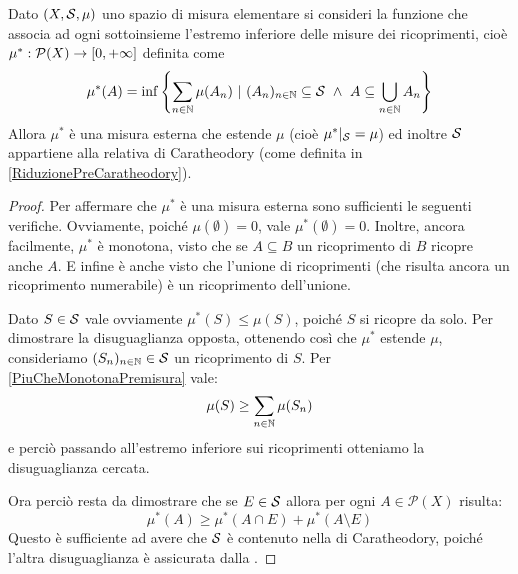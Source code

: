 \begin{proposition}\label{MisuraEsternaDiPremisura}
	Dato $(X,\S,\mu)$ uno spazio di misura elementare si consideri la funzione che associa ad ogni sottoinsieme l'estremo inferiore delle misure dei ricoprimenti, cioè $\mu^*:\mathcal P(X)\to\Rpiu$ definita come 
	\begin{equation*}
		\mu^*(A)=\inf\left\{\sum_{n\in\N} \mu(A_n)\ |\ (A_n)_{n\in\N}\subseteq\S\ \wedge
		\ A\subseteq\bigcup_{n\in\N}A_n\right\}
	\end{equation*}
	Allora $\mu^*$ è una misura esterna che estende $\mu$ (cioè $\mu^*|_\S=\mu$) ed inoltre $\S$ appartiene alla relativa \sigalg{} di Caratheodory (come definita in \cref{RiduzionePreCaratheodory}).
\end{proposition}
\begin{proof}
	Per affermare che $\mu^*$ è una misura esterna sono sufficienti le seguenti verifiche.
	Ovviamente, poiché $\mu(\emptyset)=0$, vale $\mu^*(\emptyset)=0$. 
	Inoltre, ancora facilmente, $\mu^*$ è monotona, visto che se $A\subseteq B$ un ricoprimento di $B$ ricopre anche $A$.
	E infine è anche \sigsubadd{} visto che l'unione di ricoprimenti (che risulta ancora un ricoprimento numerabile) è un ricoprimento dell'unione.
	
	Dato $S\in\S$ vale ovviamente $\mu^*(S)\le\mu(S)$, poiché $S$ si ricopre da solo. Per dimostrare la disuguaglianza opposta, ottenendo così che $\mu^*$ estende $\mu$, consideriamo $(S_n)_{n\in\N}\in \S$ un ricoprimento di $S$. Per \cref{PiuCheMonotonaPremisura} vale:
	\begin{equation*}
		\mu(S)\ge \sum_{n\in\N} \mu(S_n)
	\end{equation*}
	e perciò passando all'estremo inferiore sui ricoprimenti otteniamo la disuguaglianza cercata.
	
	Ora perciò resta da dimostrare che se $E\in \S$ allora per ogni $A\in\mathcal P(X)$ risulta:
	\begin{equation}\label{MisuraEsternaDisDifficile}
		\mu^*(A) \ge \mu^*(A\cap E)+\mu^*(A\setminus E)
	\end{equation}
	Questo è sufficiente ad avere che $\S$ è contenuto nella \sigalg{} di Caratheodory, poiché l'altra disuguaglianza è assicurata dalla \sigsubadd[ità].
	

\end{proof}
